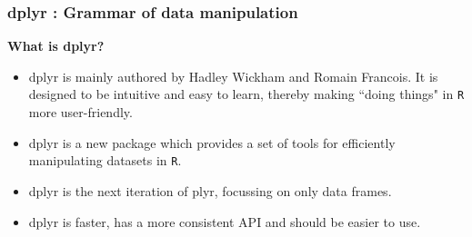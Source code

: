 \documentclass{beamer}
\begin{document}
	
	
\begin{frame}[fragile]
\frametitle{dplyr : Grammar of data manipulation}
\textbf{What is dplyr?}
\begin{itemize}
	\item dplyr is mainly authored by Hadley Wickham and Romain Francois. It is designed to be intuitive and easy to learn, thereby making ``doing things" in \texttt{R} more user-friendly.
	\item dplyr is a new package which provides a set of tools for efficiently manipulating datasets in \texttt{R}.
	\item dplyr is the next iteration of plyr, focussing on only data frames. \item dplyr is faster, has a more consistent API and should be easier to use. 
\end{itemize}
\end{frame}
\end{document}
